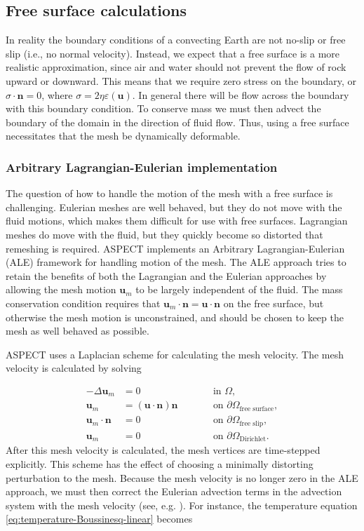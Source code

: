 \documentclass{article}
\newcommand{\aspect}{\textsc{ASPECT}}
\begin{document}
\subsection{Free surface calculations}
\label{sec:freesurface}

In reality the boundary conditions of a convecting Earth are not no-slip or
free slip (i.e., no normal velocity).  Instead, we expect that a free surface
is a more realistic approximation, since air and water should not prevent the
flow of rock upward or downward.  This means that we require zero stress on the
boundary, or $\sigma \cdot \textbf{n} = 0$, where $\sigma = 2 \eta \varepsilon (\textbf{u})$.
In general there will be flow across the boundary with this boundary condition.
To conserve mass we must then advect the boundary of the domain in the direction
of fluid flow.  Thus, using a free surface necessitates that the mesh be dynamically deformable.

\subsubsection{Arbitrary Lagrangian-Eulerian implementation}

The question of how to handle the motion of the mesh with a free surface is
challenging.  Eulerian meshes are well behaved, but they do not move with the
fluid motions, which makes them difficult for use with free surfaces.
Lagrangian meshes do move with the fluid, but they quickly become so
distorted that remeshing is required. \aspect{} implements an Arbitrary
Lagrangian-Eulerian (ALE) framework for handling motion of the mesh.  The ALE
approach tries to retain the benefits of both the Lagrangian and the Eulerian
approaches by allowing the mesh motion $\textbf{u}_m$ to be largely independent of
the fluid. The mass conservation condition requires that
$\textbf{u}_m \cdot \textbf{n} = \textbf{u} \cdot \textbf{n}$ on the free
surface, but otherwise the mesh motion is unconstrained, and should be chosen
to keep the mesh as well behaved as possible.

\aspect{} uses a Laplacian scheme for calculating the mesh velocity.  The mesh
velocity is calculated by solving

\begin{align}
-\Delta \textbf{u}_m &= 0 & \qquad & \textrm{in } \Omega, \\
\textbf{u}_m &= \left( \textbf{u} \cdot \textbf{n} \right) \textbf{n} & \qquad & \textrm{on } \partial \Omega_{\textrm{free surface}}, \\
\textbf{u}_m \cdot \textbf{n} &= 0 & \qquad & \textrm{on } \partial \Omega_{\textrm{free slip}}, \\
\textbf{u}_m &= 0 & \qquad & \textrm{on } \partial \Omega_{\textrm{Dirichlet}}.
\end{align}
After this mesh velocity is calculated, the mesh vertices are time-stepped explicitly.
This scheme has the effect of choosing a minimally distorting perturbation to the mesh.
Because the mesh velocity is no longer zero in the ALE approach, we must then correct
the Eulerian advection terms in the advection system with the mesh velocity (see, e.g.
\cite{DHPR2004}).  For instance, the temperature equation \eqref{eq:temperature-Boussinesq-linear}
becomes
\end{document}
